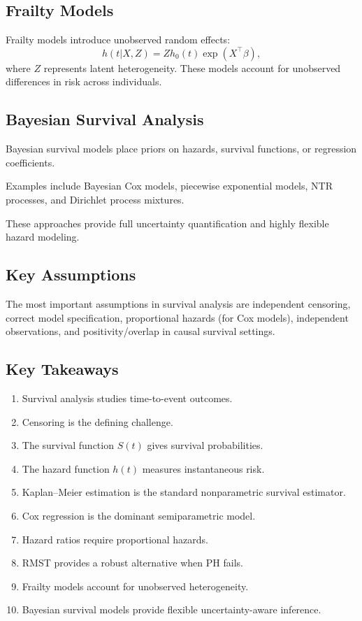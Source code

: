 \documentclass[11pt]{article}
\begin{document}
\subsection*{Frailty Models}

Frailty models introduce unobserved random effects:
\[h(t|X,Z)=Zh_0(t)\exp(X^\top\beta),\]
where $Z$ represents latent heterogeneity.
These models account for unobserved differences in risk across individuals.

\subsection*{Bayesian Survival Analysis}

Bayesian survival models place priors on hazards, survival functions, or regression coefficients.

Examples include Bayesian Cox models, piecewise exponential models, NTR processes, and Dirichlet process mixtures.

These approaches provide full uncertainty quantification and highly flexible hazard modeling.

\subsection*{Key Assumptions}

The most important assumptions in survival analysis are independent censoring, correct model specification, proportional hazards (for Cox models), independent observations, and positivity/overlap in causal survival settings.

\subsection*{Key Takeaways}

\begin{enumerate}
    \item Survival analysis studies time-to-event outcomes.
    \item Censoring is the defining challenge.
    \item The survival function \(S(t)\) gives survival probabilities.
    \item The hazard function \(h(t)\) measures instantaneous risk.
    \item Kaplan--Meier estimation is the standard nonparametric survival estimator.
    \item Cox regression is the dominant semiparametric model.
    \item Hazard ratios require proportional hazards.
    \item RMST provides a robust alternative when PH fails.
    \item Frailty models account for unobserved heterogeneity.
    \item Bayesian survival models provide flexible uncertainty-aware inference.
\end{enumerate}
\end{document}
